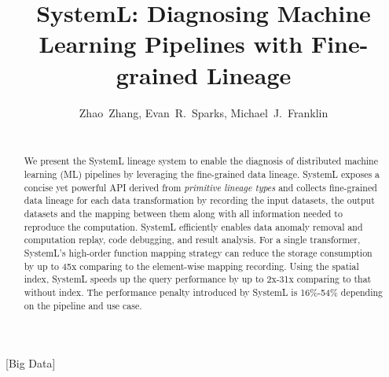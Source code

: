 \documentclass{sig-alternate}
\begin{document}
\title{SystemL: Diagnosing Machine Learning Pipelines with Fine-grained Lineage}

\author{
\alignauthor Zhao~Zhang, Evan~R.~Sparks, Michael~J.~Franklin \\\
       \\
}

\maketitle

\begin{abstract}
We present the SystemL lineage system to enable the diagnosis of distributed machine learning (ML) pipelines by leveraging the fine-grained
data lineage.  
SystemL exposes a concise yet powerful API derived from \emph{primitive lineage types} and collects fine-grained data lineage for each 
data transformation by recording the input datasets, the output datasets and the mapping between them along
with all information needed to reproduce the computation.
SystemL efficiently enables data anomaly removal and computation replay, code debugging, and result analysis.
For a single transformer, SystemL's high-order function mapping strategy can reduce the storage consumption by up to 
45x comparing to the element-wise mapping recording.
Using the spatial index, SystemL speeds up the query performance by up to 2x-31x comparing to that without index. 
The performance penalty introduced by SystemL is 16\%-54\% depending on the pipeline and use case.
\end{abstract}

[Big Data]
\end{document}
